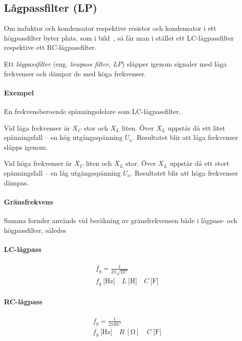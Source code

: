 \subsection{Lågpassfilter (LP)}
\label{lågpassfilter}


Om induktor och kondensator respektive resistor och kondensator i ett
högpassfilter byter plats, som i bild~, så får man i
stället ett LC-lågpassfilter respektive ett RC-lågpassfilter.

Ett \emph{lågpassfilter} (eng. \emph{lowpass filter, LP}) släpper igenom
signaler med låga frekvenser och dämpar de med höga frekvenser.

\paragraph{Exempel} En frekvensberoende spänningsdelare som LC-lågpassfilter.

Vid låga frekvenser är \(X_C\) stor och \(X_L\) liten.
Över \(X_L\) uppstår då ett litet spänningsfall -- en hög utgångsspänning
\(U_a\).
Resultatet blir att låga frekvenser släpps igenom.

Vid höga frekvenser är \(X_C\) liten och \(X_L\) stor.
Över \(X_L\) uppstår då ett stort spänningsfall -- en låg utgångsspänning
\(U_a\).
Resultatet blir att höga frekvenser dämpas.

\paragraph{Gränsfrekvens}

Samma formler används vid beräkning av gränsfrekvensen både i lågpass- och
högpassfilter, således

\paragraph{LC-lågpass}
\begin{gather*}
  f_g = \frac{1}{2\pi \sqrt{LC}} \\
  f_g\ \text{[Hz]} \quad L\ \text{[H]} \quad C\ \text{[F]}
\end{gather*}

\paragraph{RC-lågpass}
\begin{gather*}
  f_g = \frac{1}{2\pi {RC}} \\
  f_g\ \text{[Hz]} \quad R\ [\unit{\ohm}] \quad C\ \text{[F]}
\end{gather*}

